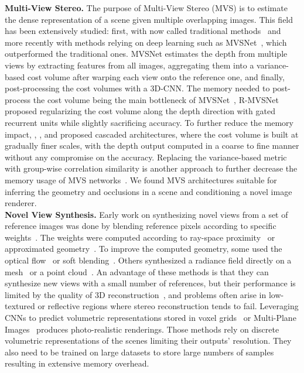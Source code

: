 \noindent\textbf{Multi-View Stereo.} The purpose of Multi-View Stereo (MVS) is to estimate the dense representation of a scene given multiple overlapping images. This field has been extensively studied: first, with now called traditional methods~\citep{kolmogorov2002multi, de1999poxels, furukawa2009accurate, schonberger2016pixelwise} and more recently with methods relying on deep learning such as MVSNet~\citep{yao2018mvsnet}, which outperformed the traditional ones. MVSNet estimates the depth from multiple views by extracting features from all images, aggregating them into a variance-based cost volume after warping each view onto the reference one, and finally, post-processing the cost volumes with a 3D-CNN. The memory needed to post-process the cost volume being the main bottleneck of MVSNet~\citep{yao2018mvsnet}, R-MVSNet~\citep{yao2019recurrent} proposed regularizing the cost volume along the depth direction with gated recurrent units while slightly sacrificing accuracy. To further reduce the memory impact, \cite{gu2020cascade}, \cite{cheng2020deep}, and \cite{yang2020cost} proposed cascaded architectures, where the cost volume is built at gradually finer scales, with the depth output computed in a coarse to fine manner without any compromise on the accuracy. Replacing the variance-based metric with group-wise correlation similarity is another approach to further decrease the memory usage of MVS networks~\citep{xu2020learning}. We found MVS architectures suitable for inferring the geometry and occlusions in a scene and conditioning a novel image renderer. \\

\noindent\textbf{Novel View Synthesis.} Early work on synthesizing novel views from a set of reference images was done by blending reference pixels according to specific weights~\citep{debevec1996modeling, levoy1996light}. The weights were computed according to ray-space proximity~\citep{levoy1996light} or approximated geometry~\citep{buehler2001unstructured, debevec1996modeling}. To improve the computed geometry, some used the optical flow~\citep{casas20154d, du2018montage4d} or soft blending~\citep{penner2017soft}. Others synthesized a radiance field directly on a mesh~\citep{debevec1998efficient, huang2020adversarial} or a point cloud~\citep{aliev2020neural, meshry2019neural}. An advantage of these methods is that they can synthesize new views with a small number of references, but their performance is limited by the quality of 3D reconstruction~\citep{jancosek2011multi, schonberger2016structure}, and problems often arise in low-textured or reflective regions where stereo reconstruction tends to fail. Leveraging CNNs to predict volumetric representations stored in voxel grids~\citep{kalantari2016learning, penner2017soft, henzler2020learning} or Multi-Plane Images~\citep{flynn2016deepstereo, zhou2018stereo, srinivasan2019pushing,flynn2019deepview} produces photo-realistic renderings. Those methods rely on discrete volumetric representations of the scenes limiting their outputs' resolution. They also need to be trained on large datasets to store large numbers of samples resulting in extensive memory overhead. \\

